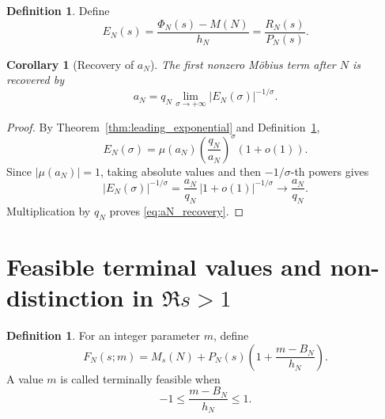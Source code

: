 \documentclass[11pt]{amsart}
\numberwithin{equation}{section}
\theoremstyle{plain}
\newtheorem{corollary}[theorem]{Corollary}
\theoremstyle{definition}
\newtheorem{definition}[theorem]{Definition}
\theoremstyle{remark}
\newcommand{\1}{\mathbf{1}}
\begin{document}
\begin{definition}
\label{def:EN}
Define
\begin{equation}
E_N(s)
=
\frac{\Phi_N(s)-M(N)}{h_N}
=
\frac{R_N(s)}{P_N(s)}.
\label{eq:EN_definition}
\end{equation}
\end{definition}

\begin{corollary}[Recovery of \(a_N\)]
\label{cor:aN_recovery}
The first nonzero Möbius term after \(N\) is recovered by
\begin{equation}
\boxed{
a_N
=
q_N
\lim_{\sigma\to+\infty}
|E_N(\sigma)|^{-1/\sigma}.
}
\label{eq:aN_recovery}
\end{equation}
\end{corollary}

\begin{proof}
By Theorem~\ref{thm:leading_exponential} and
Definition~\ref{def:EN},
\begin{equation}
E_N(\sigma)
=
\mu(a_N)
\left(\frac{q_N}{a_N}\right)^\sigma
(1+o(1)).
\label{eq:aN_recovery_asymptotic}
\end{equation}
Since \(|\mu(a_N)|=1\), taking absolute values and then
\(-1/\sigma\)-th powers gives
\begin{equation}
|E_N(\sigma)|^{-1/\sigma}
=
\frac{a_N}{q_N}
\,|1+o(1)|^{-1/\sigma}
\longrightarrow
\frac{a_N}{q_N}.
\label{eq:aN_recovery_root_limit}
\end{equation}
Multiplication by \(q_N\) proves \eqref{eq:aN_recovery}.
\end{proof}

\section{Feasible terminal values and non-distinction in \(\Re s>1\)}
\label{sec:feasible_values}

\begin{definition}
\label{def:feasible_interpolation}
For an integer parameter \(m\), define
\begin{equation}
F_N(s;m)
=
M_s(N)
+
P_N(s)
\left(
1+\frac{m-B_N}{h_N}
\right).
\label{eq:feasible_interpolation}
\end{equation}
A value \(m\) is called terminally feasible when
\begin{equation}
-1\leq\frac{m-B_N}{h_N}\leq1.
\label{eq:feasible_interval}
\end{equation}
\end{definition}
\end{document}
